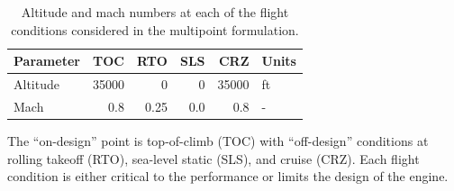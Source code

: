 \documentclass[conf]{new-aiaa}
\begin{document}
\begin{table}[hbt!]
    \centering
    \caption{Altitude and mach numbers at each of the flight conditions considered in the multipoint formulation.
    }
    \begin{tabular}{l r r r r l}
        \hline
        Parameter & TOC   & RTO  & SLS & CRZ   & Units   \\
        \hline
        Altitude  & 35000 & 0    & 0   & 35000 & \si{ft} \\
        Mach      & 0.8   & 0.25 & 0.0 & 0.8   & -       \\
        \hline
    \end{tabular}
    \label{flight_levels}
\end{table}

The ``on-design'' point is top-of-climb (TOC) with ``off-design'' conditions at rolling takeoff (RTO), sea-level static (SLS), and cruise (CRZ).
Each flight condition is either critical to the performance or limits the design of the engine.
\end{document}
